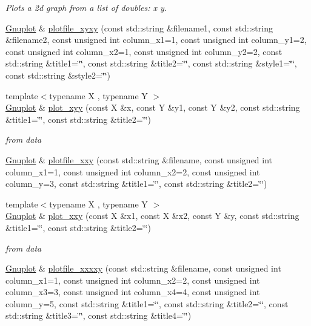 \begin{DoxyCompactItemize}
\begin{DoxyCompactList}\small\item\em Plots a 2d graph from a list of doubles\-: x y. \end{DoxyCompactList}\item 
\hyperlink{class_gnuplot}{Gnuplot} \& \hyperlink{class_gnuplot_a4410bb4c65aaf43b0ad5e510da15e20f}{plotfile\-\_\-xyxy} (const std\-::string \&filename1, const std\-::string \&filename2, const unsigned int column\-\_\-x1=1, const unsigned int column\-\_\-y1=2, const unsigned int column\-\_\-x2=1, const unsigned int column\-\_\-y2=2, const std\-::string \&title1=\char`\"{}\char`\"{}, const std\-::string \&title2=\char`\"{}\char`\"{}, const std\-::string \&style1=\char`\"{}\char`\"{}, const std\-::string \&style2=\char`\"{}\char`\"{})
\item 
{\footnotesize template$<$typename X , typename Y $>$ }\\\hyperlink{class_gnuplot}{Gnuplot} \& \hyperlink{class_gnuplot_a9ac40f453f4951f5df8212612b2b5cfd}{plot\-\_\-xyy} (const X \&x, const Y \&y1, const Y \&y2, const std\-::string \&title1=\char`\"{}\char`\"{}, const std\-::string \&title2=\char`\"{}\char`\"{})
\begin{DoxyCompactList}\small\item\em from data \end{DoxyCompactList}\item 
\hyperlink{class_gnuplot}{Gnuplot} \& \hyperlink{class_gnuplot_ac2dcfa52e5758e6472c1c161f52803af}{plotfile\-\_\-xxy} (const std\-::string \&filename, const unsigned int column\-\_\-x1=1, const unsigned int column\-\_\-x2=2, const unsigned int column\-\_\-y=3, const std\-::string \&title1=\char`\"{}\char`\"{}, const std\-::string \&title2=\char`\"{}\char`\"{})
\item 
{\footnotesize template$<$typename X , typename Y $>$ }\\\hyperlink{class_gnuplot}{Gnuplot} \& \hyperlink{class_gnuplot_a5be0d83b9fe1c9123ac4868746eda15d}{plot\-\_\-xxy} (const X \&x1, const X \&x2, const Y \&y, const std\-::string \&title1=\char`\"{}\char`\"{}, const std\-::string \&title2=\char`\"{}\char`\"{})
\begin{DoxyCompactList}\small\item\em from data \end{DoxyCompactList}\item 
\hyperlink{class_gnuplot}{Gnuplot} \& \hyperlink{class_gnuplot_a6446b66df4b42691a8cd4b9c2b04f250}{plotfile\-\_\-xxxxy} (const std\-::string \&filename, const unsigned int column\-\_\-x1=1, const unsigned int column\-\_\-x2=2, const unsigned int column\-\_\-x3=3, const unsigned int column\-\_\-x4=4, const unsigned int column\-\_\-y=5, const std\-::string \&title1=\char`\"{}\char`\"{}, const std\-::string \&title2=\char`\"{}\char`\"{}, const std\-::string \&title3=\char`\"{}\char`\"{}, const std\-::string \&title4=\char`\"{}\char`\"{})

\end{DoxyCompactItemize}
